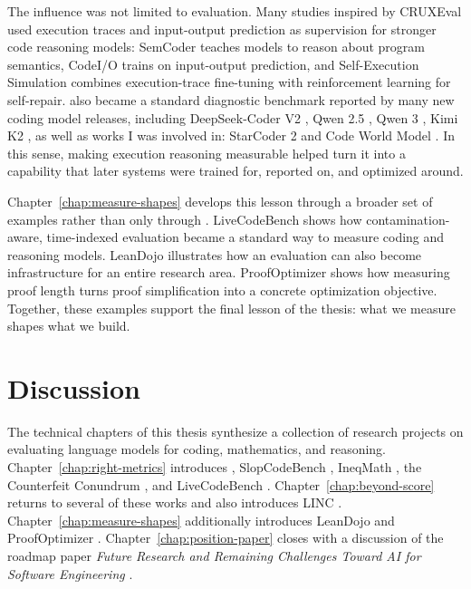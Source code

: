 The influence was not limited to evaluation. Many studies inspired by CRUXEval used execution traces and
input-output prediction as supervision for stronger code reasoning models: SemCoder
\citep{ding2024semcoder} teaches models to reason about program semantics, CodeI/O
\citep{li2025codei} trains on input-output prediction, and Self-Execution Simulation
\citep{maimon2026selfexecution} combines execution-trace fine-tuning with reinforcement learning for
self-repair. \benchmark{} also became a standard diagnostic benchmark reported by many new coding
model releases, including DeepSeek-Coder V2 \citep{deepseekai2024deepseekcoderv2}, Qwen 2.5
\citep{qwen2024qwen25coder}, Qwen 3 \citep{qwen2025qwen3technical}, Kimi K2
\citep{moonshotai2025kimik2}, as well as works I was involved in: StarCoder 2 \citep{starcoder2} and Code World Model
\citep{faircodegen2025cwm}. In this sense, making execution reasoning measurable helped turn it
into a capability that later systems were trained for, reported on, and optimized around.

Chapter~\ref{chap:measure-shapes} develops this lesson through a broader set of examples rather
than only through \benchmark{}. LiveCodeBench shows how contamination-aware, time-indexed evaluation
became a standard way to measure coding and reasoning models. LeanDojo \citep{yang2023leandojo} illustrates how an evaluation can
also become infrastructure for an entire research area. ProofOptimizer \citep{gu2026proofoptimizer} shows how measuring proof
length turns proof simplification into a concrete optimization objective. Together, these examples
support the final lesson of the thesis: what we measure shapes what we build.

\section{Discussion}

The technical chapters of this thesis synthesize a collection of research projects on evaluating
language models for coding, mathematics, and reasoning. Chapter~\ref{chap:right-metrics} introduces \benchmark{}
\citep{gu2024cruxeval}, SlopCodeBench \citep{orlanski2026slopcodebench}, IneqMath \citep{sheng2026solving},
the Counterfeit Conundrum \citep{gu2024counterfeit}, and LiveCodeBench \citep{jain2024livecodebenchholisticcontaminationfree}.
Chapter~\ref{chap:beyond-score} returns to several of these works and also introduces LINC \citep{olausson2023linc}.
Chapter~\ref{chap:measure-shapes} additionally introduces LeanDojo \citep{yang2023leandojo} and
ProofOptimizer \citep{gu2026proofoptimizer}. Chapter~\ref{chap:position-paper} closes with a discussion of the roadmap paper
\textit{Future Research and Remaining Challenges Toward AI for Software Engineering} \citep{gu2025positionaiswe}.

